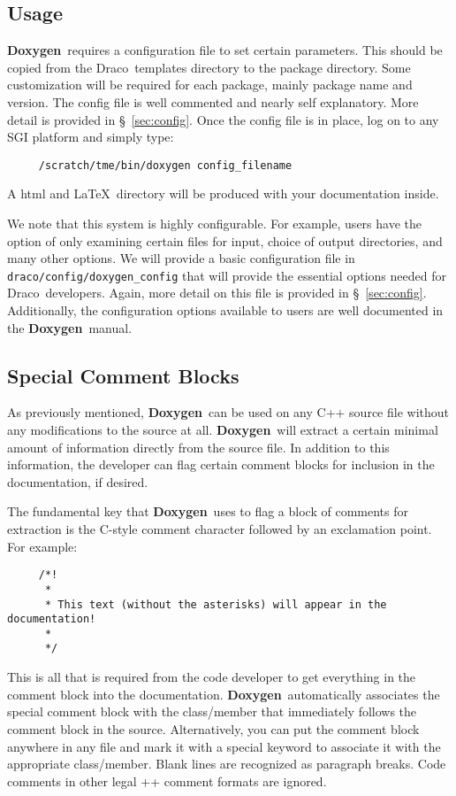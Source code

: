 \documentclass[11pt]{nmemo}
\newcommand{\draco}{{\normalfont\sffamily Draco}}
\newcommand{\doxy}{{\normalfont\bfseries Doxygen}}
\begin{document}
\subsection{Usage}

\doxy\ requires a configuration file to set certain parameters. This
should be copied from the \draco\ templates directory to the package
directory.  Some customization will be required for each package,
mainly package name and version. The config file is well commented and
nearly self explanatory. More detail is provided in \S~\ref{sec:config}.
Once the config file is in place, log on to any SGI
platform and simply type:
\begin{verbatim} 
     /scratch/tme/bin/doxygen config_filename
\end{verbatim}
A html and \LaTeX\ directory will be produced with your documentation 
inside.  

We note that this system is highly configurable.  For example, users
have the option of only examining certain files for input, choice of
output directories, and many other options.  We will provide a basic
configuration file in \texttt{draco/config/doxygen\_config} that will
provide the essential options needed for \draco\ developers.  Again, 
more detail on this file is provided in \S~\ref{sec:config}.
Additionally, the configuration options available to users are well
documented in the \doxy\ manual.

\subsection{Special Comment Blocks}
\label{sec:spcom}

As previously mentioned, \doxy\ can be used on any C++ source file
without any modifications to the source at all.  \doxy\ will extract a
certain minimal amount of information directly from the source file.
In addition to this information, the developer can flag certain
comment blocks for inclusion in the documentation, if desired.

The fundamental key that \doxy\ uses to flag a block of comments for
extraction is the C-style comment character followed by an exclamation
point. For example:
\begin{verbatim}
     /*!
      *
      * This text (without the asterisks) will appear in the documentation!
      *
      */
\end{verbatim}
This is all that is required from the code developer to get everything
in the comment block into the documentation. \doxy\ automatically associates
the special comment block with the class/member that immediately follows the 
comment block in the source. Alternatively, you can put the comment block
anywhere in any file and mark it with a special keyword to associate it
with the appropriate class/member. Blank lines are recognized as paragraph
breaks. Code comments in other legal \C++ comment formats are ignored.
\end{document}
